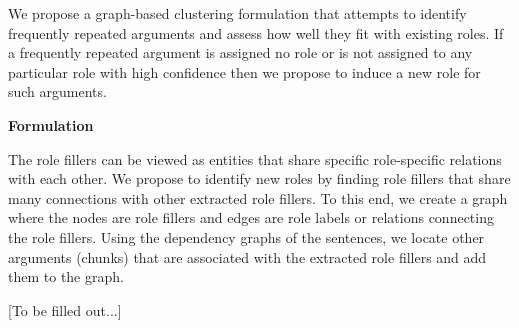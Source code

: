 We propose a graph-based clustering formulation that attempts to identify frequently repeated arguments
and assess how well they fit with existing roles. If a frequently repeated argument is assigned no role
or is not assigned to any particular role with high confidence then we propose to induce a new role 
for such arguments. 

{\bf Formulation} 

The role fillers can be viewed as entities that share specific role-specific relations with each other. 
We propose to identify new roles by finding role fillers that share many connections with other 
extracted role fillers. To this end, we create a graph where the nodes are role fillers and 
edges are role labels or relations connecting the role fillers. Using the dependency graphs
of the sentences, we locate other arguments (chunks) that are associated with the 
extracted role fillers and add them to the graph. 

[To be filled out...]







